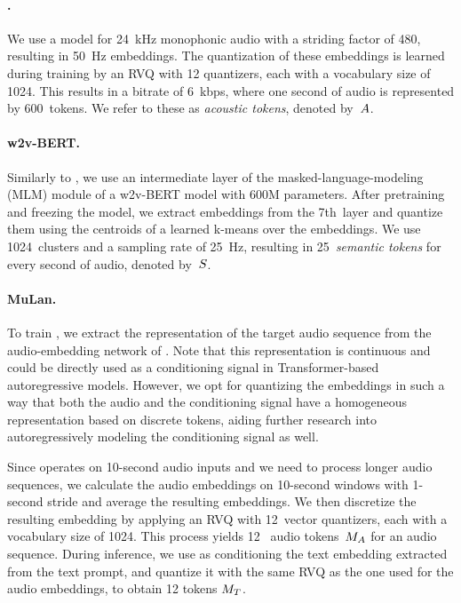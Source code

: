 \paragraph{{\soundstream}.}
We use a {\soundstream} model for 24~kHz monophonic audio with a striding factor of 480, resulting in 50~Hz embeddings. The quantization of these embeddings is learned during training by an RVQ with 12 quantizers, each with a vocabulary size of 1024. This results in a bitrate of 6~kbps, where one second of audio is represented by 600~tokens. We refer to these as \emph{acoustic tokens}, denoted by~$A$.

\paragraph{w2v-BERT.}
Similarly to \audiolm, we use an intermediate layer of the masked-language-modeling (MLM) module of a w2v-BERT model with 600M parameters. After pretraining and freezing the model, we extract embeddings from the 7th~layer and quantize them using the centroids of a learned k-means over the embeddings. We use 1024~clusters and a sampling rate of 25~Hz, resulting in 25~\emph{semantic tokens} for every second of audio, denoted by~$S$.

\paragraph{MuLan.}
To train {\model}, we extract the representation of the target audio sequence from the audio-embedding network of {\mulan}. Note that this representation is continuous and could be directly used as a conditioning signal in Transformer-based autoregressive models. However, we opt for quantizing the {\mulan} embeddings in such a way that both the audio and the conditioning signal have a homogeneous representation based on discrete tokens,
aiding further research into autoregressively modeling the conditioning signal as well.

Since {\mulan} operates on 10-second audio inputs and we need to process longer audio sequences, we calculate the audio embeddings on 10-second windows with 1-second stride and average the resulting embeddings. We then discretize the resulting embedding by applying an RVQ with 12~vector quantizers, each with a vocabulary size of 1024. This process yields 12~{\mulan} audio tokens~$M_A$ for an audio sequence.
During inference, we use as conditioning the {\mulan} text embedding extracted from the text prompt, and quantize it with the same RVQ as the one used for the audio embeddings, to obtain 12 tokens $M_T$.


